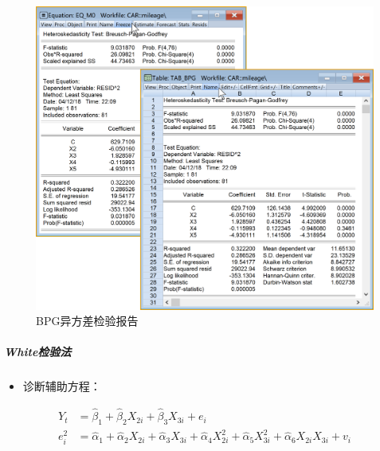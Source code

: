 \documentclass[12pt,(landscape,a4paper),(portrait,a4paper)]{article}
\providecommand{\tightlist}{%
  \setlength{\itemsep}{0pt}\setlength{\parskip}{0pt}}
\let\oldsubparagraph\subparagraph
\renewcommand{\subparagraph}[1]{\oldsubparagraph{#1}\mbox{}}
\begin{document}
\begin{figure}

{\centering \includegraphics[width=29.25in]{picture/lab6-heteroskedasticity/4-test-BPG2} 

}

\caption{BPG异方差检验报告}\label{fig:fig-BPG-report}
\end{figure}

\hypertarget{white}{%
\subparagraph{White检验法}\label{white}}

\begin{itemize}
\tightlist
\item
  诊断辅助方程：
\end{itemize}

\begin{align}
Y_t & =\hat{\beta}_1+\hat{\beta}_2X_{2i}+\hat{\beta}_3X_{3i}+e_{i} \label{eq:M0-white} \\
e^2_i & =\hat{\alpha}_1+\hat{\alpha}_2X_{2i}+\hat{\alpha}_3X_{3i}+\hat{\alpha}_4X^2_{2i}+\hat{\alpha}_5X^2_{3i}+\hat{\alpha}_6X_{2i}X_{3i}+v_i \label{eq:A-white}
\end{align}
\end{document}
